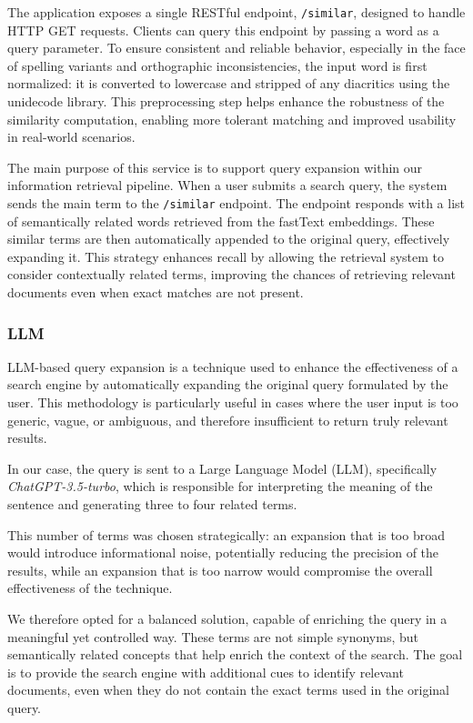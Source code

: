 The application exposes a single RESTful endpoint, \texttt{/similar}, designed to handle HTTP GET requests. Clients can query this endpoint by passing a word as a query parameter. To ensure consistent and reliable behavior, especially in the face of spelling variants and orthographic inconsistencies, the input word is first normalized: it is converted to lowercase and stripped of any diacritics using the unidecode library. This preprocessing step helps enhance the robustness of the similarity computation, enabling more tolerant matching and improved usability in real-world scenarios.

The main purpose of this service is to support query expansion within our information retrieval pipeline. When a user submits a search query, the system sends the main term to the \texttt{/similar} endpoint. The endpoint responds with a list of semantically related words retrieved from the fastText embeddings. These similar terms are then automatically appended to the original query, effectively expanding it. This strategy enhances recall by allowing the retrieval system to consider contextually related terms, improving the chances of retrieving relevant documents even when exact matches are not present.


\subsubsection{LLM}
\label{subsubsec:LLM}
LLM-based query expansion is a technique used to enhance the effectiveness of a search engine by automatically expanding the original query formulated by the user. This methodology is particularly useful in cases where the user input is too generic, vague, or ambiguous, and therefore insufficient to return truly relevant results.

In our case, the query is sent to a Large Language Model (LLM), specifically \textit{ChatGPT-3.5-turbo}, which is responsible for interpreting the meaning of the sentence and generating three to four related terms.

This number of terms was chosen strategically: an expansion that is too broad would introduce informational noise, potentially reducing the precision of the results, while an expansion that is too narrow would compromise the overall effectiveness of the technique.

We therefore opted for a balanced solution, capable of enriching the query in a meaningful yet controlled way. These terms are not simple synonyms, but semantically related concepts that help enrich the context of the search. The goal is to provide the search engine with additional cues to identify relevant documents, even when they do not contain the exact terms used in the original query.

